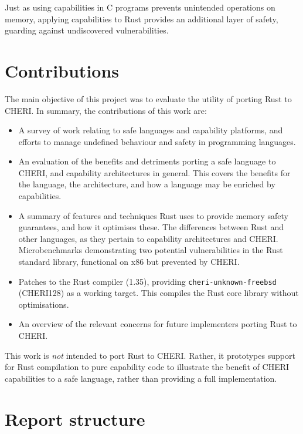 \documentclass[dissertation.tex]{subfiles}
\begin{document}
Just as using capabilities in C programs prevents unintended operations
on memory, applying capabilities to Rust provides an additional layer of
safety, guarding against undiscovered vulnerabilities.


\section{Contributions}
\label{sec:intro-contrib}

The main objective of this project was to evaluate the utility of
porting Rust to CHERI.
In summary, the contributions of this work are:


\begin{itemize}
    \item A survey of work relating to safe languages and capability
    platforms, and efforts to manage undefined behaviour and safety in
    programming languages.
    \item An evaluation of the benefits and detriments porting a safe
    language to CHERI, and capability architectures in general.
    This covers the benefits for the language, the architecture, and how
    a language may be enriched by capabilities.
    \item A summary of features and techniques Rust uses to provide
    memory safety guarantees, and how it optimises these.
    The differences between Rust and other languages, as they pertain to
    capability architectures and CHERI.
    Microbenchmarks demonstrating two potential vulnerabilities in
    the Rust standard library, functional on x86 but prevented by CHERI.
    \item Patches to the Rust compiler (1.35), providing
    \texttt{cheri-unknown-freebsd} (CHERI128) as a working target.
    This compiles the Rust core library without optimisations.
    \item An overview of the relevant concerns for future implementers
    porting Rust to CHERI.
\end{itemize}

This work is \emph{not} intended to port Rust to CHERI.
Rather, it prototypes support for Rust compilation to pure capability
 code to illustrate the benefit of CHERI
capabilities to a safe language, rather than providing a full
implementation.


\section{Report structure}
\todo{}
\end{document}
